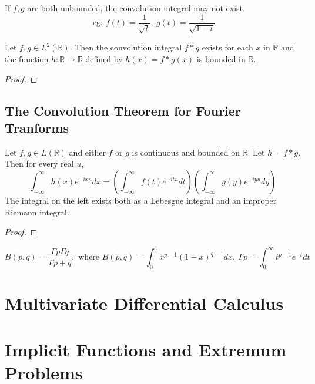 \begin{remark}
	If $f,g$ are both unbounded, the convolution integral may not exist.
	$$\text{ eg: } f(t) = \frac{1}{\sqrt{t}},\ g(t) = \frac{1}{\sqrt{1-t}}$$
\end{remark}

\begin{theorem}
	Let $f,g \in L^2(\mathbb{R})$. Then the convolution integral $f \ast g$ exists for each $x$ in $\mathbb{R}$ and the function $h : \mathbb{R} \to \mathbb{R}$ defined by $h(x) = f \ast g (x)$ is bounded in $\mathbb{R}$.
\end{theorem}
\begin{synopsis}
\end{synopsis}
\begin{proof}
\end{proof}

\section{The Convolution Theorem for Fourier Tranforms}
\begin{theorem}
	Let $f,g \in L(\mathbb{R})$ and either $f$ or $g$ is continuous and bounded on $\mathbb{R}$. Let $h = f \ast g$. Then for every real $u$,
	$$ \int_{-\infty}^\infty h(x) e^{-ixu} dx = \left( \int_{-\infty}^\infty f(t) e^{-itu} dt \right) \left( \int_{-\infty}^\infty g(y) e^{-iyu} dy \right)$$
	The integral on the left exists both as a Lebesgue integral and an improper Riemann integral.
\end{theorem}
\begin{synopsis}
\end{synopsis}
\begin{proof}
\end{proof}

\begin{remark}
	$$B(p,q) = \frac{\Gamma{p} \Gamma{q}}{\Gamma{p+q}},\text{ where } B(p,q) = \int_0^1 x^{p-1} (1-x)^{q-1} dx,\ \Gamma{p} = \int_0^\infty t^{p-1} e^{-t} dt$$
\end{remark}
\chapter{Multivariate Differential Calculus}
\chapter{Implicit Functions and Extremum Problems}

